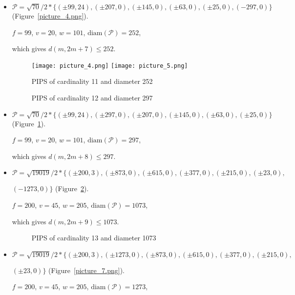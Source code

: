 \documentclass[12pt]{article}
\theoremstyle{theorem}
\theoremstyle{dfn}
\theoremstyle{remark}
\begin{document}
\begin{itemize}
\item
$\mathcal{P}=\sqrt{70}/{2} * \{ (\pm 99, 24),
(\pm 207 , 0),
(\pm 145 , 0),
(\pm 63 , 0),
(\pm 25 , 0),
(-297 , 0)\}
$
(Figure~\ref{picture_4.png}).

$f = 99$, $v = 20$, $w = 101$, $\operatorname{diam(\mathcal{P})} = 252$,

which gives $d(m, 2m + 7) \leq 252$.


\begin{figure}[htbp]
	\texttt{[image: picture\_4.png]}
	\hfill
	\texttt{[image: picture\_5.png]}
	\\
	\parbox{.48\linewidth}{\caption{PIPS of cardinality 11 and diameter 252}
	\label{picture_4.png}}
	\hfill
	\parbox{.48\linewidth}{\caption{PIPS of cardinality 12 and diameter 297}
	\label{picture_5.png}}
\end{figure}


\item
$\mathcal{P}=\sqrt{70}/{2} * \{ (\pm 99, 24),
(\pm 297 , 0),
(\pm 207 , 0),
(\pm 145 , 0),
(\pm 63 , 0),
(\pm 25 , 0)\}
$
(Figure~\ref{picture_5.png}).

$f = 99$, $v = 20$, $w = 101$, $\operatorname{diam(\mathcal{P})} = 297$,

which gives $d(m, 2m + 8) \leq 297$.


\item
$\mathcal{P}=\sqrt{19019}/{2} * \{ (\pm 200, 3),
(\pm 873 , 0),
(\pm 615 , 0),
(\pm 377 , 0),
(\pm 215 , 0),
(\pm 23 , 0),
$

$
(-1273 , 0)\}
$
(Figure~\ref{picture_6.png}).

$f = 200$, $v = 45$, $w = 205$, $\operatorname{diam(\mathcal{P})} = 1073$,

which gives $d(m, 2m + 9) \leq 1073$.


\begin{figure}[h!]
\parbox{0.7\linewidth}{\caption{PIPS of cardinality 13 and diameter 1073}
\label{picture_6.png}}
\end{figure}


\item
$\mathcal{P}=\sqrt{19019}/{2} * \{ (\pm 200, 3),
(\pm 1273 , 0),
(\pm 873 , 0),
(\pm 615 , 0),
(\pm 377 , 0),
(\pm 215 , 0),
$

$
(\pm 23 , 0)\}
$
(Figure~\ref{picture_7.png}).

$f = 200$, $v = 45$, $w = 205$, $\operatorname{diam(\mathcal{P})} = 1273$,


\end{itemize}
\end{document}
